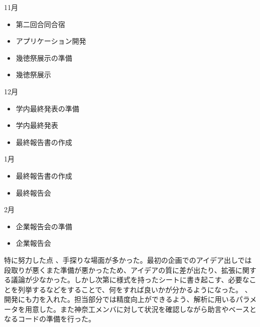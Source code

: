 11月
\begin{itemize}
\item 第二回合同合宿
\item アプリケーション開発
\item 幾徳祭展示の準備
\item 幾徳祭展示
\end{itemize}
12月
\begin{itemize}
\item 学内最終発表の準備
\item 学内最終発表
\item 最終報告書の作成
\end{itemize}
1月
\begin{itemize}
\item 最終報告書の作成
\item 最終報告会
\end{itemize}
2月
\begin{itemize}
\item 企業報告会の準備
\item 企業報告会
\end{itemize}

特に努力した点
、手探りな場面が多かった。最初の企画でのアイデア出しでは段取りが悪くまた準備が悪かったため、アイデアの質に差が出たり、拡張に関する議論が少なかった。しかし次第に様式を持ったシートに書き起こす、必要なことを列挙するなどをすることで、何をすれば良いかが分かるようになった。
、開発にも力を入れた。担当部分では精度向上ができるよう、解析に用いるパラメータを用意した。また神奈工メンバに対して状況を確認しながら助言やベースとなるコードの準備を行った。

